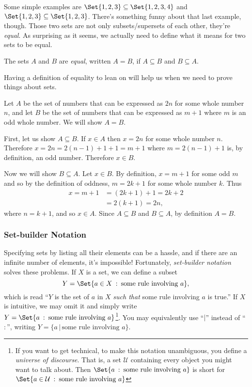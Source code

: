 	Some simple examples are $\Set{1,2,3}\subseteq \Set{1,2,3,4}$ and $\Set{1,2,3}\subseteq\Set{1,2,3}$.
	There's something funny about that last example, though.  Those two sets are not only subsets/supersets
	of each other, they're \emph{equal}.  As surprising as it seems, we actually need to define
	what it means for two sets to be equal.
	\begin{definition}
		The sets $A$ and $B$ are \emph{equal}, written $A=B$, if $A\subseteq B$ and $B\subseteq A$.
	\end{definition}
	Having a definition of equality to lean on will help us when we need to prove things about sets.

	\begin{example}
		Let $A$ be the set of numbers that can be expressed
		as $2n$ for some whole number $n$, and let $B$ be the
		set of numbers that can be expressed as $m+1$ where $m$ is
		an odd whole number.  We will show $A=B$.

		First, let us show $A\subseteq B$.  If $x\in A$ then $x=2n$
		for some whole number $n$.  Therefore $x=2n=2(n-1)+1+1=m+1$ where
		$m=2(n-1)+1$ is, by definition, an odd number.  Therefore $x\in B$.

		Now we will show $B\subseteq A$.  Let $x\in B$.  By definition,
		$x=m+1$ for some odd $m$ and so by the definition of oddness, $m=2k+1$
		for some whole number $k$.  Thus 
		\begin{align*}
			x=m+1&=(2k+1)+1=2k+2\\
			&=2(k+1)=2n,
		\end{align*} where $n=k+1$, and so $x\in A$.  Since $A\subseteq B$
		and $B\subseteq A$, by definition $A=B$.
	\end{example}
	

	\subsubsection{Set-builder Notation}
	Specifying sets by listing all their elements can be a hassle, and if there are an infinite
	number of elements, it's impossible!  Fortunately, \emph{set-builder notation}
	solves these problems.
	If $X$ is a set, we can define a subset 
	\[
		Y= \Set{a\in X\given\text{some rule involving }a},
	\]
	which is read ``$Y$ is the set of $a$ in $X$ \emph{such that} some rule
	involving $a$ is true.''  If $X$ is intuitive, we may omit it and
	simply write $Y=\Set{a\given\text{some rule involving }a}$\footnote{ If you want
	to get technical, to make this notation unambiguous, you define a 
	\emph{universe of discourse}.  That is, a set $\mathcal U$ containing
	every object you might want to talk about.  Then $\Set{a\given\text{some rule involving }a}$
	is short for $\Set{a\in\mathcal U\given\text{some rule involving }a}$}.  You may equivalently
	use ``$|$'' instead of ``$:$'', writing $Y=\{a\,|\,\text{some rule involving }a\}$.

